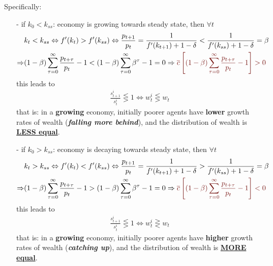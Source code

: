 \documentclass[10pt,landscape,a4paper]{article}
\let\bar\overline
\begin{document}
\begin{multicols*}{3}
Specifically:
\begin{itemize}
    \item[-] if $k_0<k_{ss}$: economy is growing towards steady state, then $\forall t$
    \begin{align*}
        &k_{t}<k_{ss}\Leftrightarrow f'(k_t)>f'(k_{ss}) \Leftrightarrow \frac{p_{t+1}}{p_t} = \frac{1}{f'(k_{t+1})+1-\delta} <\frac{1}{f'(k_{ss})+1-\delta} =\beta\\
        \Rightarrow & (1-\beta)\sum^{\infty}_{\tau=0}\frac{p_{t+\tau}}{p_t}-1 < (1-\beta)\sum^{\infty}_{\tau=0}\beta^{\tau} - 1 = 0 \Rightarrow {\color{myred}\bar{c}\left[(1-\beta)\sum^{\infty}_{\tau=0}\frac{p_{t+\tau}}{p_t}-1\right]>0}
    \end{align*}
    this leads to 
    \begin{align*}
        \frac{s_{t+1}^i}{s_t^i} \lesseqgtr 1 \Leftrightarrow w_t^i \lesseqgtr w_t
    \end{align*}
    that is: in a \textbf{growing} economy, initially poorer agents have \textbf{\color{myred}lower} growth rates of wealth  (\textbf{\textit{\color{myred}falling more behind}}), and the distribution of wealth is \underline{\textbf{\color{myred}LESS equal}}.
    \item[-] if $k_0 > k_{ss}$: economy is decaying towards steady state, then $\forall t$
    \begin{align*}
        &k_{t}>k_{ss}\Leftrightarrow f'(k_t)<f'(k_{ss}) \Leftrightarrow \frac{p_{t+1}}{p_t} = \frac{1}{f'(k_{t+1})+1-\delta} >\frac{1}{f'(k_{ss})+1-\delta} =\beta\\
        \Rightarrow & (1-\beta)\sum^{\infty}_{\tau=0}\frac{p_{t+\tau}}{p_t}-1 > (1-\beta)\sum^{\infty}_{\tau=0}\beta^{\tau} - 1 = 0 \Rightarrow {\color{myred}\bar{c}\left[(1-\beta)\sum^{\infty}_{\tau=0}\frac{p_{t+\tau}}{p_t}-1\right]<0}
    \end{align*}
    this leads to
    \begin{align*}
        \frac{s_{t+1}^i}{s_t^i} \lesseqgtr 1 \Leftrightarrow w_t^i \gtreqless w_t
    \end{align*}
    that is: in a \textbf{growing} economy, initially poorer agents have \textbf{\color{myred}higher} growth rates of wealth (\textbf{\textit{\color{myred}catching up}}), and the distribution of wealth is \underline{\textbf{\color{myred}MORE equal}}.
    
\end{itemize}


\end{multicols*}
\end{document}
